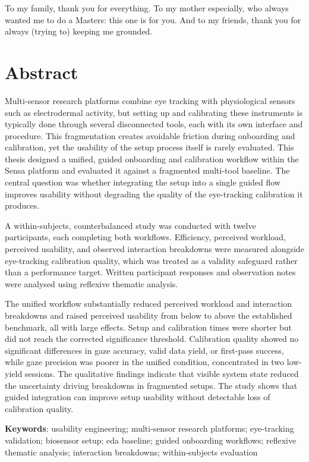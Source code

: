 \documentclass[
]{article}
\begin{document}
To my family, thank you for everything. To my mother especially, who always wanted me to do a Master\textquotesingle s: this one is for you. And to my friends, thank you for always (trying to) keeping me grounded.

\clearpage
\hypertarget{abstract}{%
\section{Abstract}\label{abstract}}

Multi-sensor research platforms combine eye tracking with physiological sensors such as electrodermal activity, but setting up and calibrating these instruments is typically done through several disconnected tools, each with its own interface and procedure. This fragmentation creates avoidable friction during onboarding and calibration, yet the usability of the setup process itself is rarely evaluated. This thesis designed a unified, guided onboarding and calibration workflow within the Sensa platform and evaluated it against a fragmented multi-tool baseline. The central question was whether integrating the setup into a single guided flow improves usability without degrading the quality of the eye-tracking calibration it produces.

A within-subjects, counterbalanced study was conducted with twelve participants, each completing both workflows. Efficiency, perceived workload, perceived usability, and observed interaction breakdowns were measured alongside eye-tracking calibration quality, which was treated as a validity safeguard rather than a performance target. Written participant responses and observation notes were analysed using reflexive thematic analysis.

The unified workflow substantially reduced perceived workload and interaction breakdowns and raised perceived usability from below to above the established benchmark, all with large effects. Setup and calibration times were shorter but did not reach the corrected significance threshold. Calibration quality showed no significant differences in gaze accuracy, valid data yield, or first-pass success, while gaze precision was poorer in the unified condition, concentrated in two low-yield sessions. The qualitative findings indicate that visible system state reduced the uncertainty driving breakdowns in fragmented setups. The study shows that guided integration can improve setup usability without detectable loss of calibration quality.

\textbf{Keywords}: usability engineering; multi-sensor research platforms; eye-tracking validation; biosensor setup; eda baseline; guided onboarding workflows; reflexive thematic analysis; interaction breakdowns; within-subjects evaluation
\end{document}
